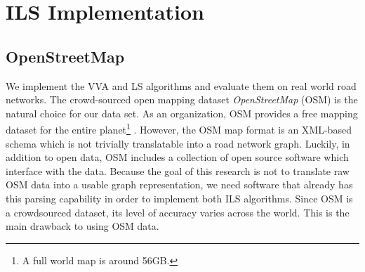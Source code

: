 \documentclass[honors]{union-cs-thesis}
\begin{document}
\section{ILS Implementation}

\subsection{OpenStreetMap}
We implement the VVA and LS algorithms and evaluate them on real world road networks. The crowd-sourced open mapping dataset \emph{OpenStreetMap} (OSM) is the natural choice for our data set. As an organization, OSM  provides a free mapping dataset for the entire planet\footnote{A full world map is around 56GB.} \cite{osm}. However, the OSM map format is an XML-based schema which is not trivially translatable into a road network graph. Luckily, in addition to open data, OSM includes a collection of open source software which interface with the data. Because the goal of this research is not to translate raw OSM data into a usable graph representation, we need software that already has this parsing capability in order to implement both ILS algorithms. Since OSM is a crowdsourced dataset, its level of accuracy varies across the world. This is the main drawback to using OSM data. 
\end{document}

